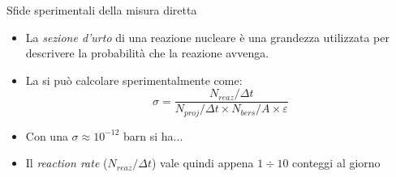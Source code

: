 \documentclass [xcolor=svgnames] {beamer}
\begin{document}
\begin{frame}{Sfide sperimentali della misura diretta}
	\begin{itemize}
		\item<1-> La \emph{sezione d'urto} di una reazione nucleare è una grandezza utilizzata per descrivere la probabilità che la reazione avvenga.
		\item<2-> La si può calcolare sperimentalmente come:
		\begin{equation}
			\sigma = \dfrac{N_{reaz}/\Delta t}{N_{proj}/\Delta t \times N_{bers}/A \times \varepsilon}
		\end{equation}
		\item<3-> Con una $\sigma \approx 10^{-12}$ barn si ha... 
		\item<4-> Il \emph{reaction rate} ($N_{reaz}/\Delta t$) vale quindi appena $1\div 10$ conteggi al giorno
	\end{itemize}
\end{frame}
\end{document}
